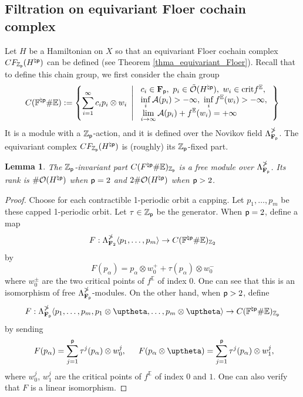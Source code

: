 \documentclass[reqno, 10pt]{amsart}
\numberwithin{equation}{section}
\numberwithin{equation}{section}
\newtheorem{lemma}[thm]{Lemma}
\theoremstyle{definition}
\theoremstyle{remark}
\newcommand{\beqn}{\begin{equation*}}
\newcommand{\eeqn}{\end{equation*}}
\newcommand{\mb}{\mathbb}
\newcommand{\mc}{\mathcal}
\newcommand{\p}{{\sf p}}
\newcommand{\fp}{{\bf F}_{\sf p}}
\newcommand{\zp}{{{\mb Z}_{\sf p}}}
\newcommand{\ep}{{{\mathbb E}}}
\begin{document}
\subsection{Filtration on equivariant Floer cochain complex}

Let $H$ be a Hamiltonian on $X$ so that an equivariant Floer cochain complex $CF_{\zp} (H^{\natural \p})$ can be defined (see Theorem \ref{thma_equivariant_Floer}). Recall that to define this chain group, we first consider the chain group
\beqn
C ( {\mb F}^{\natural \p} \# {\mb E} ):= \left\{ \sum_{i=1}^\infty c_i p_i \otimes w_i\ \left|\ \begin{array}{l} c_i \in \fp,\ p_i \in \tilde {\mc O}(H^{\natural \p}),\ w_i \in {\rm crit} f^\ep,\\
\displaystyle \inf_i {\mc A}(p_i) >-\infty,\ \inf_i f^\ep(w_i) > -\infty,\\
\displaystyle \lim_{i \to \infty} {\mc A}(p_i) + f^\ep(w_i) = +\infty 
\end{array} \right. \right\}
\eeqn
It is a module with a $\zp$-action, and it is defined over the Novikov field $\Lambda_{\fp}^{\mb\Pi}$. The equivariant complex $CF_{\zp}(H^{\natural \p})$ is (roughly) its $\zp$-fixed part.  

\begin{lemma}
The $\zp$-invariant part $C(F^{\natural \p}\# {\mb E})_{\zp}$ is a free module over $\Lambda_{\fp}^{\mb{\Pi}}$. Its rank is $\# {\mc O}(H^{\natural \p})$ when $\p = 2$ and $2 \# {\mc O}(H^{\natural \p})$ when $\p > 2$.
\end{lemma}

\begin{proof}
Choose for each contractible 1-periodic orbit a capping. Let $p_1, \ldots, p_m$ be these capped 1-periodic orbit. Let $\tau \in \zp$ be the generator. When $\p = 2$, define a map
\beqn
F: \Lambda_{{\bf F}_2}^{\mb\Pi} \langle p_1, \ldots, p_m \rangle \to C ({\mb F}^{\natural \p} \# {\mb E})_{{\mb Z}_2}
\eeqn
by 
\beqn
F(p_\alpha) = p_\alpha \otimes w_0^+ + \tau(p_\alpha) \otimes w_0^- 
\eeqn
where $w_0^\pm$ are the two critical points of $f^\ep$ of index $0$. One can see that this is an isomorphism of free $\Lambda_{\fp}^{\mb{\Pi}}$-modules. On the other hand, when $\p>2$, define
\beqn
F: \Lambda_{\fp}^{\mb\Pi}\langle p_1, \ldots, p_m, p_1 \otimes \uptheta, \ldots, p_m \otimes \uptheta \rangle \to C ({\mb F}^{\natural \p} \# {\mb E})_{\zp}
\eeqn
by sending 
\begin{align*}
&\ F(p_\alpha) = \sum_{j=1}^\p \tau^j(p_\alpha) \otimes w_0^j,\ &\ F(p_\alpha \otimes \uptheta) = \sum_{j=1}^\p \tau^j (p_\alpha) \otimes w_1^j,
\end{align*}
where $w_0^j$, $w_1^j$ are the critical points of $f^\ep$ of index $0$ and $1$. One can also verify that $F$ is a linear isomorphism.
\end{proof}
\end{document}
